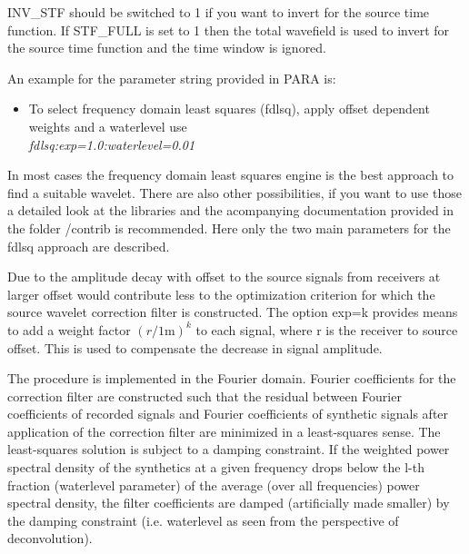 {\color{blue}{\begin{verbatim}
"Definition of inversion for source time function" : "comment",
			"INV_STF" : "0",
			"PARA" : "fdlsq:exp=1.0",
			"N_STF" : "10",
			"N_STF_START" : "1",
			"TAPER_STF" : "0",
			
			"TRKILL_STF" : "0", 
			"TRKILL_FILE_STF" : "./trace_kill/trace_kill",
			"STF_FULL" : "0",
			"TRKILL_STF_OFFSET" : "0", 
			"TRKILL_STF_OFFSET_LOWER" : "10",
			"TRKILL_STF_OFFSET_UPPER" : "20",
			"TRKILL_STF_OFFSET_INVERT" : "0",
\end{verbatim}}}

{\color{red}{\begin{verbatim}
Default values are:
	INV_STF=0
\end{verbatim}}}

INV\_STF should be switched to 1 if you want to invert for the source time function. If STF\_FULL is set to 1 then the total wavefield is used to invert for the source time function and the time window is ignored.
\newline

An example for the parameter string provided in PARA is:
\begin{itemize}
 \item To select frequency domain least squares (fdlsq), apply offset dependent weights and a waterlevel use\\
 \textit{fdlsq:exp=1.0:waterlevel=0.01}
\end{itemize}

In most cases the frequency domain least squares engine is the best approach to find a suitable wavelet. There are also other possibilities, if you want to use those a detailed look at the libraries and the acompanying documentation provided in the folder /contrib is recommended. Here only the two main parameters for the fdlsq approach are described.

Due to the amplitude decay with offset to the source signals from receivers at larger offset would contribute less to the optimization criterion for which the source wavelet correction filter is constructed. The option exp=k provides means to add a weight factor $(r/1\text{m})^k$ to each signal, where r is the receiver to source offset. This is used to compensate the decrease in signal amplitude.

The procedure is implemented in the Fourier domain. Fourier coefficients for the correction filter are constructed such that the residual between Fourier coefficients of recorded signals and Fourier coefficients of synthetic signals after application of the correction filter are minimized in a least-squares sense. The least-squares solution is subject to a damping constraint. If the weighted power spectral density of the synthetics at a given frequency drops below the l-th fraction (waterlevel parameter) of the average (over all frequencies) power spectral density, the filter coefficients are damped (artificially made smaller) by the damping constraint (i.e. waterlevel as seen from the perspective of deconvolution). 

